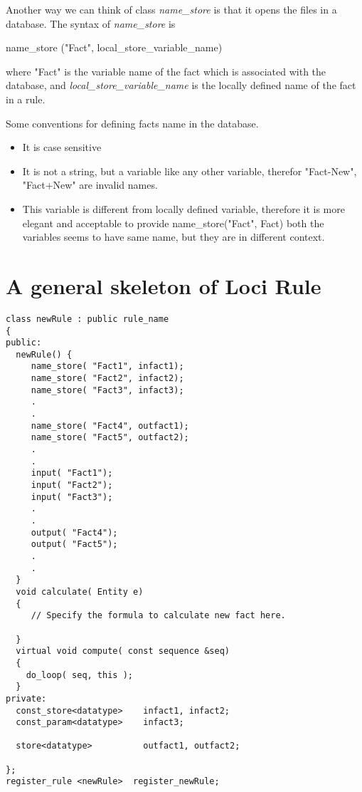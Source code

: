 \par Another way we can think of class {\em name\_store} is that it opens the
files in a database. The syntax of {\em name\_store} is
\begin{center}
name\_store ("Fact", local\_store\_variable\_name)
\end{center}
where "Fact" is the variable name of the fact which is associated with the database,
and {\em local\_store\_variable\_name} is the locally defined name 
of the fact in a rule. 

\par Some conventions for defining facts name in the database.

\begin{itemize}
\item  It is case sensitive
\item  It is not a string, but a variable like any other variable, therefor
       "Fact-New", "Fact+New" are invalid names.
\item  This variable is different from locally defined variable, therefore 
       it is more elegant and acceptable to provide  name\_store("Fact", Fact)
       both the variables seems to have same name, but they are in different
       context.
\end{itemize}


\section  { A general skeleton of Loci Rule }
\begin{verbatim}
class newRule : public rule_name 
{
public:
  newRule() { 
     name_store( "Fact1", infact1);
     name_store( "Fact2", infact2);
     name_store( "Fact3", infact3);
     .
     .
     name_store( "Fact4", outfact1);
     name_store( "Fact5", outfact2);
     .
     .
     input( "Fact1");
     input( "Fact2");
     input( "Fact3");
     .
     .
     output( "Fact4");
     output( "Fact5");
     .
     .
  }
  void calculate( Entity e)
  {
     // Specify the formula to calculate new fact here.

  }
  virtual void compute( const sequence &seq)
  {
    do_loop( seq, this );
  }
private:
  const_store<datatype>    infact1, infact2;
  const_param<datatype>    infact3;

  store<datatype>          outfact1, outfact2;

};
register_rule <newRule>  register_newRule;
\end{verbatim}

